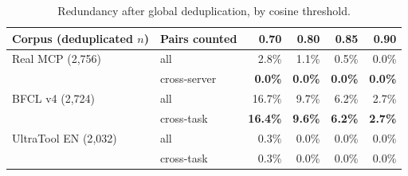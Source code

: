 \documentclass[11pt]{article}
\begin{document}
\begin{table}[h]
\centering
\begin{tabular}{llrrrr}
\toprule
Corpus (deduplicated $n$) & Pairs counted & 0.70 & 0.80 & 0.85 & 0.90 \\
\midrule
Real MCP (2{,}756)     & all           & 2.8\%  & 1.1\% & 0.5\% & 0.0\% \\
                       & cross-server  & \textbf{0.0\%}  & \textbf{0.0\%} & \textbf{0.0\%} & \textbf{0.0\%} \\
\addlinespace
BFCL v4 (2{,}724)      & all           & 16.7\% & 9.7\% & 6.2\% & 2.7\% \\
                       & cross-task    & \textbf{16.4\%} & \textbf{9.6\%} & \textbf{6.2\%} & \textbf{2.7\%} \\
\addlinespace
UltraTool EN (2{,}032) & all           & 0.3\%  & 0.0\% & 0.0\% & 0.0\% \\
                       & cross-task    & 0.3\%  & 0.0\% & 0.0\% & 0.0\% \\
\bottomrule
\end{tabular}
\caption{Redundancy after global deduplication, by cosine threshold.}
\label{tab:redundancy}
\end{table}
\end{document}
